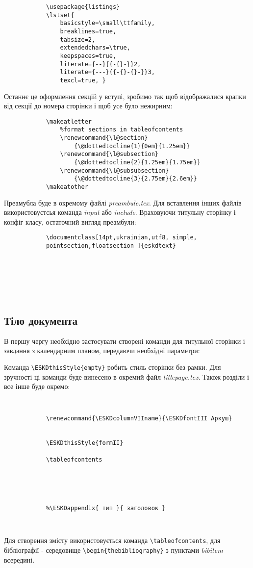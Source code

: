 \begin{lstlisting}
			\usepackage{listings}
			\lstset{
				basicstyle=\small\ttfamily,
				breaklines=true,
				tabsize=2,                  
				extendedchars=\true,
				keepspaces=true,
				literate={--}{{-{}-}}2,     
				literate={---}{{-{}-{}-}}3, 
				texcl=true, }
\end{lstlisting}

Останнє це оформлення секцій у вступі, зробимо так щоб відображалися крапки від секції до номера сторінки і щоб усе було нежирним:

\begin{lstlisting}
			\makeatletter
				%format sections in tableofcontents
				\renewcommand{\l@section}
					{\@dottedtocline{1}{0em}{1.25em}}
				\renewcommand{\l@subsection}
					{\@dottedtocline{2}{1.25em}{1.75em}}
				\renewcommand{\l@subsubsection}
					{\@dottedtocline{3}{2.75em}{2.6em}}
			\makeatother
\end{lstlisting}

Преамубла буде в окремому файлі \textit{preambule.tex}. Для вставлення інших файлів використовуєтсья команда \textit{input} або \textit{include}. Враховуючи титульну сторінку і конфіг класу, остаточний вигляд преамбули:

\begin{lstlisting}
			\documentclass[14pt,ukrainian,utf8, simple, 
			pointsection,floatsection ]{eskdtext} 
			
			
			
			
			
			
\end{lstlisting}

\subsection{Тіло документа}

В першу чергу необхідно застосувати створені команди для титульної сторінки і завдання з календарним планом, передаючи необхідні параметри:


Команда \verb|\ESKDthisStyle{empty}| робить стиль сторінки без рамки. Для зручності ці команди буде винесено в окремий файл \textit{titlepage.tex}. Також розділи і все інше буде окремо:

\begin{lstlisting}
			
			
			\renewcommand{\ESKDcolumnVIIname}{\ESKDfontIII Аркуш}
			
			
			\ESKDthisStyle{formII}
			
			\tableofcontents
			
			
			 
			
			
			%\ESKDappendix{ тип }{ заголовок }
			
			
\end{lstlisting}

Для створення змісту використовується команда \verb|\tableofcontents|, для бібліографії - середовище \verb|\begin{thebibliography}| з пунктами \textit{bibitem} всередині.